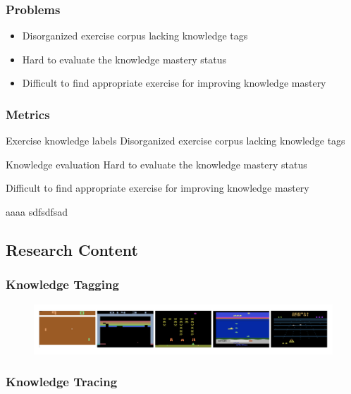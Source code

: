 \documentclass{beamer}
\begin{document}
\begin{frame}
  \frametitle{Problems}
  \begin{itemize}
    \item Disorganized exercise corpus lacking knowledge tags
    \item Hard to evaluate the knowledge mastery status
    \item Difficult to find appropriate exercise for improving knowledge mastery
  \end{itemize}
\end{frame}
\begin{frame}
  \frametitle{Metrics}
  \begin{block}{Exercise knowledge labels}
    Disorganized exercise corpus lacking knowledge tags
  \end{block}
  \begin{block}{Knowledge evaluation}
    Hard to evaluate the knowledge mastery status
  \end{block}
  \begin{block}{}
    Difficult to find appropriate exercise for improving knowledge mastery
  \end{block}
  \begin{alertblock}{aaaa}
    sdfsdfsad
  \end{alertblock}
\end{frame}
\subsection{Research Content}
\begin{frame}
  \frametitle{Knowledge Tagging}
  \begin{figure}
    \includegraphics[width=1.0\textwidth]{figures/atari.png}
  \end{figure}
\end{frame}


\begin{frame}
  \frametitle{Knowledge Tracing}

\end{frame}
\end{document}
